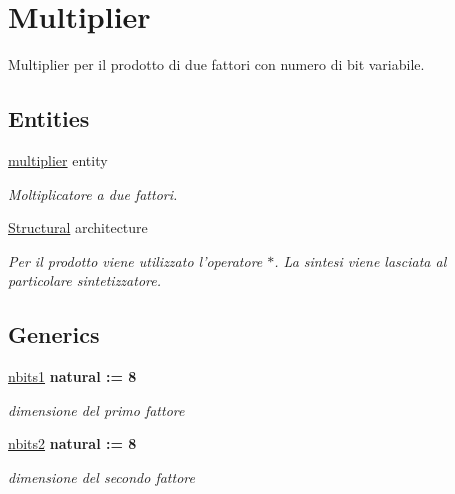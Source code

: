 \hypertarget{group___multiplier}{\section{Multiplier}
\label{group___multiplier}
}


Multiplier per il prodotto di due fattori con numero di bit variabile.  


\subsection*{Entities}
\begin{DoxyCompactItemize}
\item 
\hyperlink{classmultiplier}{multiplier} entity
\begin{DoxyCompactList}\small\item\em Moltiplicatore a due fattori. \end{DoxyCompactList}\item 
\hyperlink{classmultiplier_1_1_structural}{Structural} architecture
\begin{DoxyCompactList}\small\item\em Per il prodotto viene utilizzato l'operatore $\ast$. La sintesi viene lasciata al particolare sintetizzatore. \end{DoxyCompactList}\end{DoxyCompactItemize}
\subsection*{Generics}
 \begin{DoxyCompactItemize}
\item 
\hyperlink{group___multiplier_ga4ede473cdc13e75fe66fbd548b62e432}{nbits1} {\bfseries {\bfseries \textcolor{vhdlchar}{natural}\textcolor{vhdlchar}{ }\textcolor{vhdlchar}{ }\textcolor{vhdlchar}{\+:}\textcolor{vhdlchar}{=}\textcolor{vhdlchar}{ }\textcolor{vhdlchar}{ } \textcolor{vhdldigit}{8} \textcolor{vhdlchar}{ }}}
\begin{DoxyCompactList}\small\item\em dimensione del primo fattore \end{DoxyCompactList}\item 
\hyperlink{group___multiplier_ga8b5bdaff4c3669528aaec95a07e17c2a}{nbits2} {\bfseries {\bfseries \textcolor{vhdlchar}{natural}\textcolor{vhdlchar}{ }\textcolor{vhdlchar}{ }\textcolor{vhdlchar}{\+:}\textcolor{vhdlchar}{=}\textcolor{vhdlchar}{ }\textcolor{vhdlchar}{ } \textcolor{vhdldigit}{8} \textcolor{vhdlchar}{ }}}
\begin{DoxyCompactList}\small\item\em dimensione del secondo fattore \end{DoxyCompactList}\end{DoxyCompactItemize}

